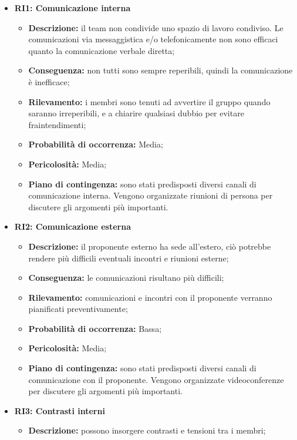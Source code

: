 \begin{itemize}
\begin{itemize}
	\end{itemize}
	\item \textbf{RI1: Comunicazione interna}
	\begin{itemize}
		\item \textbf{Descrizione:} il team non condivide uno spazio di lavoro condiviso. Le comunicazioni via messaggistica e/o telefonicamente non sono efficaci quanto la comunicazione verbale diretta;
		\item \textbf{Conseguenza:} non tutti sono sempre reperibili, quindi la comunicazione è inefficace;
		\item \textbf{Rilevamento:} i membri sono tenuti ad avvertire il gruppo quando saranno irreperibili, e a chiarire qualsiasi dubbio per evitare fraintendimenti;
		\item \textbf{Probabilità di occorrenza:} Media;
		\item \textbf{Pericolosità:} Media;
		\item \textbf{Piano di contingenza:} sono stati predisposti diversi canali di comunicazione interna. Vengono organizzate riunioni di persona per discutere gli argomenti più importanti. %
	\end{itemize}
	\item \textbf{RI2: Comunicazione esterna}
	\begin{itemize}
		\item \textbf{Descrizione:} il proponente esterno ha sede all'estero, ciò potrebbe rendere più difficili eventuali incontri e riunioni esterne;
		\item \textbf{Conseguenza:} le comunicazioni risultano più difficili;
		\item \textbf{Rilevamento:} comunicazioni e incontri con il proponente verranno pianificati preventivamente;
		\item \textbf{Probabilità di occorrenza:} Bassa;
		\item \textbf{Pericolosità:} Media;
		\item \textbf{Piano di contingenza:} sono stati predisposti diversi canali di comunicazione con il proponente. Vengono organizzate videoconferenze per discutere gli argomenti più importanti.
	\end{itemize}
	\item \textbf{RI3: Contrasti interni}
	\begin{itemize}
		\item \textbf{Descrizione:} possono insorgere contrasti e tensioni tra i membri;

\end{itemize}
\end{itemize}
